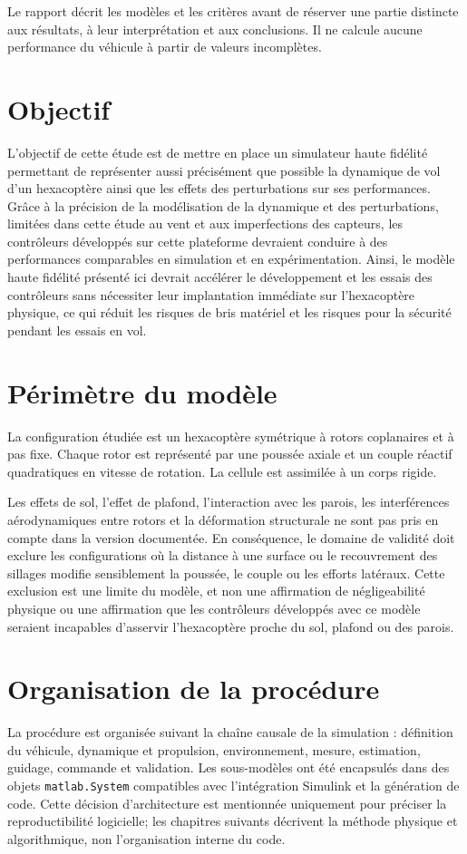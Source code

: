 \documentclass[11pt,a4paper,oneside]{report}
\begin{document}
	Le rapport décrit les modèles et les critères avant de réserver une partie distincte aux résultats, à leur interprétation et aux conclusions. Il ne calcule aucune performance du véhicule à partir de valeurs incomplètes.
	
	\section{Objectif}
	
	L'objectif de cette étude est de mettre en place un simulateur haute fidélité permettant de représenter aussi précisément que possible la dynamique de vol d'un hexacoptère ainsi que les effets des perturbations sur ses performances. Grâce à la précision de la modélisation de la dynamique et des perturbations, limitées dans cette étude au vent et aux imperfections des capteurs, les contrôleurs développés sur cette plateforme devraient conduire à des performances comparables en simulation et en expérimentation. Ainsi, le modèle haute fidélité présenté ici devrait accélérer le développement et les essais des contrôleurs sans nécessiter leur implantation immédiate sur l'hexacoptère physique, ce qui réduit les risques de bris matériel et les risques pour la sécurité pendant les essais en vol.
	
	
	
	\section{Périmètre du modèle}
	La configuration étudiée est un hexacoptère symétrique à rotors coplanaires et à pas fixe. Chaque rotor est représenté par une poussée axiale et un couple réactif quadratiques en vitesse de rotation. La cellule est assimilée à un corps rigide.
	
	Les effets de sol, l'effet de plafond, l'interaction avec les parois, les interférences aérodynamiques entre rotors et la déformation structurale ne sont pas pris en compte dans la version documentée. En conséquence, le domaine de validité doit exclure les configurations où la distance à une surface ou le recouvrement des sillages modifie sensiblement la poussée, le couple ou les efforts latéraux. Cette exclusion est une limite du modèle, et non une affirmation de négligeabilité physique ou une affirmation que les contrôleurs développés avec ce modèle seraient incapables d'asservir l'hexacoptère proche du sol, plafond ou des parois.
	
	\section{Organisation de la procédure}
	La procédure est organisée suivant la chaîne causale de la simulation : définition du véhicule, dynamique et propulsion, environnement, mesure, estimation, guidage, commande et validation. Les sous-modèles ont été encapsulés dans des objets \texttt{matlab.System} compatibles avec l'intégration Simulink et la génération de code. Cette décision d'architecture est mentionnée uniquement pour préciser la reproductibilité logicielle; les chapitres suivants décrivent la méthode physique et algorithmique, non l'organisation interne du code.
	
\end{document}
